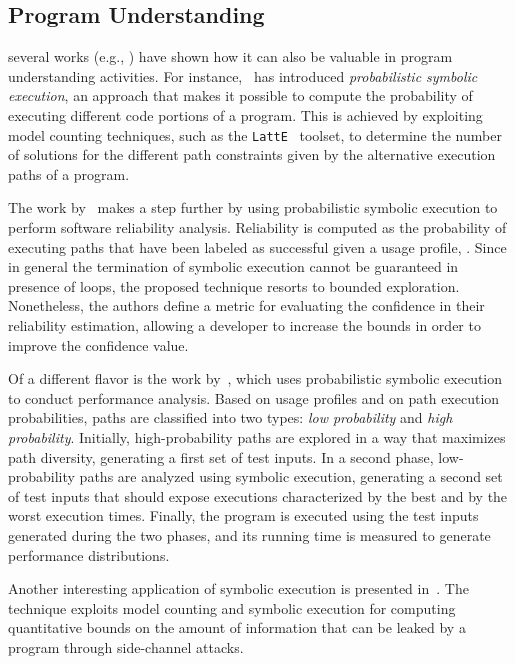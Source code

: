 \subsection{Program Understanding}
 several works (e.g., \cite{GDV-ISSTA12,FPV-ICSE13,CLL-ICSE16}) have shown how it can also be valuable in  program understanding activities. For instance,~\cite{GDV-ISSTA12} has introduced {\em probabilistic symbolic execution}, an approach that makes it possible to compute the probability of executing different code portions of a program. This is achieved by exploiting model counting techniques, such as the {\tt LattE}~\cite{LHT-JSC04} toolset, to determine the number of solutions for the different path constraints given by the alternative execution paths of a program.

The work by~\cite{FPV-ICSE13} makes a step further by using probabilistic symbolic execution to perform software reliability analysis. Reliability is computed as the probability of executing paths that have been labeled as successful given a usage profile, .  Since in general the termination of symbolic execution cannot be guaranteed in presence of loops, the proposed technique resorts to bounded exploration. Nonetheless, the authors define a metric for evaluating the confidence in their reliability estimation, allowing a developer to increase the bounds in order to improve the confidence value.

Of a different flavor is the work by~\cite{CLL-ICSE16}, which uses probabilistic symbolic execution to conduct performance analysis. Based on usage profiles and on path execution probabilities, paths are classified into two types: {\em low probability} and {\em high probability}. Initially, high-probability paths are explored in a way that maximizes path diversity, generating a first set of test inputs. In a second phase, low-probability paths are analyzed using symbolic execution, generating a second set of test inputs that should expose executions characterized by the best and by the worst execution times. Finally, the program is executed using the test inputs generated during the two phases, and its running time is measured to generate performance distributions. 

Another interesting application of symbolic execution  is presented in~\cite{PPM-CSF18}. The technique exploits model counting and symbolic execution for computing quantitative bounds on the amount of information that can be leaked by a program through side-channel attacks. 
	
